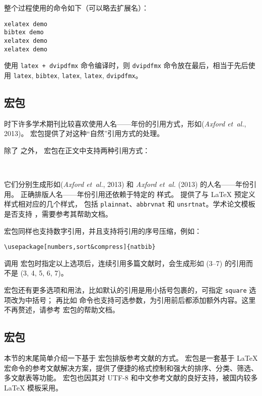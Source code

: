 整个过程使用的命令如下（可以略去扩展名）：
\begin{verbatim}
xelatex demo
bibtex demo
xelatex demo
xelatex demo
\end{verbatim}

使用 \texttt{latex + dvipdfmx} 命令编译时，则 \texttt{dvipdfmx} 命令放在最后，相当于先后使用
\texttt{latex}, \texttt{bibtex}, \texttt{latex}, \texttt{latex}, \texttt{dvipdfmx}。

\subsection{ 宏包}\label{subsec:natbib}

时下许多学术期刊比较喜欢使用人名——年份的引用方式，形如(\emph{Axford et~al.}, 2013)。
 宏包提供了对这种“自然”引用方式的处理。

除了  之外， 宏包在正文中支持两种引用方式：
\begin{command}
 \\
\end{command}

它们分别生成形如(\emph{Axford et~al.}, 2013) 和 \emph{Axford et~al.} (2013) 的人名——年份引用。
正确排版人名——年份引用还依赖于特定的  样式。 提供了与 \LaTeX{} 预定义样式相对应的几个样式，
包括 \texttt{plainnat}、\texttt{abbrvnat} 和 \texttt{unsrtnat}。学术论文模板是否支持 ，需要参考其帮助文档。

 宏包同样也支持数字引用，并且支持将引用的序号压缩，例如：
\begin{verbatim}
\usepackage[numbers,sort&compress]{natbib}
\end{verbatim}
调用  宏包时指定以上选项后，连续引用多篇文献时，会生成形如 (3--7) 的引用而不是 (3, 4, 5, 6, 7)。

 宏包还有更多选项和用法，比如默认的引用是用小括号包裹的，可指定 \texttt{square} 选项改为中括号；
再比如  命令也支持可选参数，为引用前后都添加额外内容。这里不再赘述，请参考  宏包的帮助文档。


\subsection{ 宏包}\label{subsec:biblatex}

本节的末尾简单介绍一下基于  宏包排版参考文献的方式。
 宏包是一套基于 \LaTeX{} 宏命令的参考文献解决方案，提供了便捷的格式控制和强大的排序、分类、筛选、多文献表等功能。
 宏包也因其对 UTF-8 和中文参考文献的良好支持，被国内较多 \LaTeX{} 模板采用。

